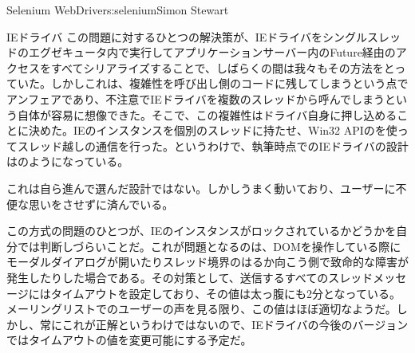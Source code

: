 \begin{aosachapter}{Selenium WebDriver}{s:selenium}{Simon Stewart}
\begin{aosasect1}{IEドライバ}
この問題に対するひとつの解決策が、IEドライバをシングルスレッドのエグゼキュータ内で実行してアプリケーションサーバー内のFuture経由のアクセスをすべてシリアライズすることで、しばらくの間は我々もその方法をとっていた。しかしこれは、複雑性を呼び出し側のコードに残してしまうという点でアンフェアであり、不注意でIEドライバを複数のスレッドから呼んでしまうという自体が容易に想像できた。そこで、この複雑性はドライバ自身に押し込めることに決めた。IEのインスタンスを個別のスレッドに持たせ、Win32 APIのを使ってスレッド越しの通信を行った。というわけで、執筆時点でのIEドライバの設計はのようになっている。


これは自ら進んで選んだ設計ではない。しかしうまく動いており、ユーザーに不便な思いをさせずに済んでいる。

この方式の問題のひとつが、IEのインスタンスがロックされているかどうかを自分では判断しづらいことだ。これが問題となるのは、DOMを操作している際にモーダルダイアログが開いたりスレッド境界のはるか向こう側で致命的な障害が発生したりした場合である。その対策として、送信するすべてのスレッドメッセージにはタイムアウトを設定しており、その値は太っ腹にも2分となっている。メーリングリストでのユーザーの声を見る限り、この値はほぼ適切なようだ。しかし、常にこれが正解というわけではないので、IEドライバの今後のバージョンではタイムアウトの値を変更可能にする予定だ。


\end{aosasect1}
\end{aosachapter}
